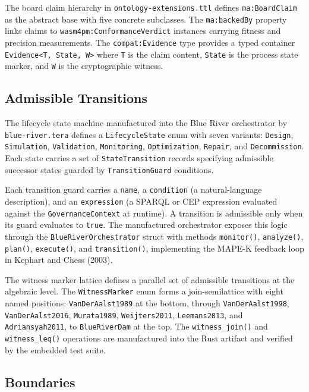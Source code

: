 The board claim hierarchy in \texttt{ontology-extensions.ttl} defines \texttt{ma:BoardClaim} as
the abstract base with five concrete subclasses. The \texttt{ma:backedBy} property links claims to
\texttt{wasm4pm:ConformanceVerdict} instances carrying fitness and precision measurements. The
\texttt{compat:Evidence} type provides a typed container \texttt{Evidence<T, State, W>} where
\texttt{T} is the claim content, \texttt{State} is the process state marker, and \texttt{W} is
the cryptographic witness.

\subsection{Admissible Transitions}
\label{sec:ggen-architecture-transitions}

The lifecycle state machine manufactured into the Blue River orchestrator by \texttt{blue-river.tera}
defines a \texttt{LifecycleState} enum with seven variants: \texttt{Design}, \texttt{Simulation},
\texttt{Validation}, \texttt{Monitoring}, \texttt{Optimization}, \texttt{Repair}, and
\texttt{Decommission}. Each state carries a set of \texttt{StateTransition} records specifying
admissible successor states guarded by \texttt{TransitionGuard} conditions.

Each transition guard carries a \texttt{name}, a \texttt{condition} (a natural-language
description), and an \texttt{expression} (a SPARQL or CEP expression evaluated against the
\texttt{GovernanceContext} at runtime). A transition is admissible only when its guard evaluates
to \texttt{true}. The manufactured orchestrator exposes this logic through the
\texttt{BlueRiverOrchestrator} struct with methods \texttt{monitor()}, \texttt{analyze()},
\texttt{plan()}, \texttt{execute()}, and \texttt{transition()}, implementing the MAPE-K feedback
loop in Kephart and Chess (2003).

The witness marker lattice defines a parallel set of admissible transitions at the algebraic
level. The \texttt{WitnessMarker} enum forms a join-semilattice with eight named positions:
\texttt{VanDerAalst1989} at the bottom, through \texttt{VanDerAalst1998},
\texttt{VanDerAalst2016}, \texttt{Murata1989}, \texttt{Weijters2011}, \texttt{Leemans2013}, and
\texttt{Adriansyah2011}, to \texttt{BlueRiverDam} at the top. The \texttt{witness\_join()} and
\texttt{witness\_leq()} operations are manufactured into the Rust artifact and verified by the
embedded test suite.

\subsection{Boundaries}
\label{sec:ggen-architecture-boundaries}

